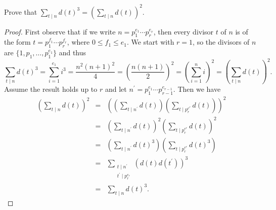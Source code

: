 \documentclass[10pt]{amsart}
\begin{document}
\begin{thm}
  Prove that $\sum_{t \mid n} d(t)^3 = \left(\sum_{t \mid n} d(t)\right)^2$.
  
  \begin{proof}
    First observe that if we write $n = p_1^{e_1} \cdots p_r^{e_r}$, then every divisor $t$ of $n$ is of the form $t = p_1^{f_1} \cdots p_r^{f_r}$, where $0 \leq f_1 \leq e_1$.
    We start with $r = 1$, so the divisors of $n$ are $\{1, p_1, \ldots, p_1^{e_1}\}$ and thus
    $$\sum_{t \mid n} d(t)^3 = \sum_{i = 1}^{e_1} i^3 = \frac{n^2(n+1)^2}{4} = \left(\frac{n(n+1)}{2}\right)^2 = \left(\sum_{i = 1}^n i\right)^2 = \left(\sum_{t \mid n} d(t)\right)^2.$$
    Assume the result holds up to $r$ and let $n^\prime = p_1^{e_1} \cdots p_{r-1}^{e_{r-1}}$.
    Then we have
    \begin{eqnarray*}
      \left(\sum_{t \mid n} d(t)\right)^2 &=& \left(\left(\sum_{t \mid n^\prime} d(t)\right)\left(\sum_{t \mid p_r^{e^r}} d(t)\right)\right)^2\\
      &=& \left(\sum_{t \mid n^\prime} d(t)\right)^2 \left(\sum_{t \mid p_r^{e^r}} d(t)\right)^2\\
      &=& \left(\sum_{t \mid n^\prime} d(t)^3\right)\left( \sum_{t \mid p_r^{e^r}} d(t)^3\right)\\
      &=& \sum_{\substack{t \mid n^\prime\\t^\prime \mid p_r^{e_r}}} \left(d(t)d(t^\prime)\right)^3\\
      &=& \sum_{t \mid n} d(t)^3.
    \end{eqnarray*}
  \end{proof}
\end{thm}
\end{document}
